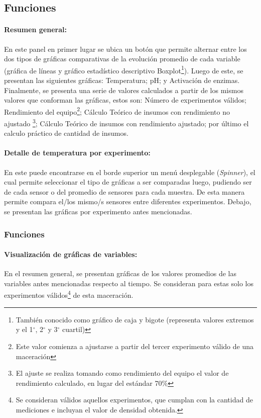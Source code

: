             \subsection{Funciones}
            
            \paragraph{Resumen general:} En este panel en primer lugar se ubica un botón que permite alternar entre los dos tipos de gráficas comparativas de la evolución promedio de cada variable (gráfica de líneas y gráfico estadístico descriptivo Boxplot\footnote{También conocido como gráfico de caja y bigote (representa valores extremos y el 1$^{\circ}$, 2$^{\circ}$ y 3$^{\circ}$ cuartil)}). Luego de este, se presentan las siguientes gráficas: Temperatura; pH; y Activación de enzimas. Finalmente, se presenta una serie de valores calculados a partir de los mismos valores que conforman las gráficas, estos son: Número de experimentos válidos; Rendimiento del equipo\footnote{Este valor comienza a ajustarse a partir del tercer experimento válido de una maceración}; Cálculo Teórico de insumos con rendimiento no ajustado \footnote{El ajuste se realiza tomando como rendimiento del equipo el valor de rendimiento calculado, en lugar del estándar 70\%}; Cálculo Teórico de insumos con rendimiento ajustado; por último el calculo práctico de cantidad de insumos. 
            
            \paragraph{Detalle de temperatura por experimento:} En este puede encontrarse en el borde superior un menú desplegable (\textit{Spinner}), el cual permite seleccionar el tipo de gráficas a ser comparadas luego, pudiendo ser de cada sensor o del promedio de sensores para cada muestra. De esta manera permite compara el/los mismo/s sensores entre diferentes experimentos. Debajo, se presentan las gráficas por experimento antes mencionadas.
            
            \subsubsection{Funciones}
            \paragraph{Visualización de gráficas de variables:}
              En el resumen general, se presentan gráficas de los valores promedios de las variables antes mencionadas respecto al tiempo. Se consideran para estas solo los experimentos válidos\footnote{Se consideran válidos aquellos experimentos, que cumplan con la cantidad de mediciones e incluyan el valor de densidad obtenida.} de esta maceración.
            
